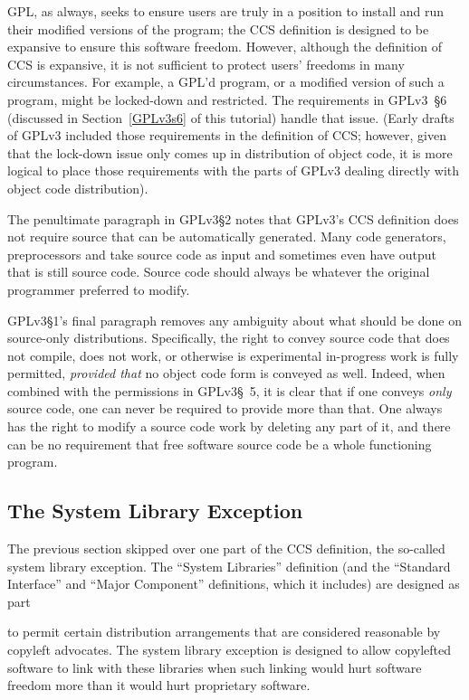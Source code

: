 GPL, as always, seeks to ensure users are truly in a position to install and
run their modified versions of the program; the CCS definition is designed to
be expansive to ensure this software freedom.  However, although the
definition of CCS is expansive, it is not sufficient to protect users'
freedoms in many circumstances.  For example, a GPL'd program, or a modified
version of such a program, might be locked-down and restricted.  The
requirements in GPLv3~\S6 (discussed in Section~\ref{GPLv3s6} of this
tutorial) handle that issue.  (Early drafts of GPLv3 included those
requirements in the definition of CCS; however, given that the lock-down
issue only comes up in distribution of object code, it is more logical to
place those requirements with the parts of GPLv3 dealing directly with object
code distribution).

The penultimate paragraph in GPLv3\S2 notes that GPLv3's CCS definition does
not require source that can be automatically generated.  Many code
generators, preprocessors and take source code as input and sometimes even
have output that is still source code.  Source code should always be whatever
the original programmer preferred to modify.

GPLv3\S1's final paragraph removes any ambiguity about what should be done on
source-only distributions.  Specifically, the right to convey source code
that does not compile, does not work, or otherwise is experimental
in-progress work is fully permitted, \textit{provided that} no object code
form is conveyed as well.  Indeed, when combined with the permissions in
GPLv3\S~5, it is clear that if one conveys \textit{only} source code, one can
never be required to provide more than that.  One always has the right to
modify a source code work by deleting any part of it, and there can be no
requirement that free software source code be a whole functioning program.

\subsection{The System Library Exception}

The previous section skipped over one part of the CCS definition, the
so-called system library exception.  The ``System Libraries'' definition (and
the ``Standard Interface'' and ``Major Component'' definitions, which it
includes) are designed as part

to permit certain distribution arrangements that are considered reasonable by
copyleft advocates.  The system library exception is designed to allow
copylefted software to link with these libraries when such linking would hurt
software freedom more than it would hurt proprietary software.

